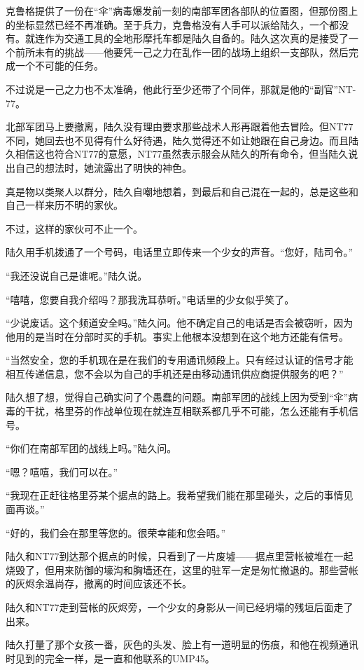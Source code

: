 克鲁格提供了一份在“伞”病毒爆发前一刻的南部军团各部队的位置图，但那份图上的坐标显然已经不再准确。至于兵力，克鲁格没有人手可以派给陆久，一个都没有。就连作为交通工具的全地形摩托车都是陆久自备的。陆久这次真的是接受了一个前所未有的挑战——他要凭一己之力在乱作一团的战场上组织一支部队，然后完成一个不可能的任务。

不过说是一己之力也不太准确，他此行至少还带了个同伴，那就是他的“副官”NT-77。

北部军团马上要撤离，陆久没有理由要求那些战术人形再跟着他去冒险。但NT77不同，她回去也不见得有什么好待遇，陆久觉得还不如让她跟在自己身边。而且陆久相信这也符合NT77的意愿，NT77虽然表示服会从陆久的所有命令，但当陆久说出自己的想法时，她流露出了明快的神色。

真是物以类聚人以群分，陆久自嘲地想着，到最后和自己混在一起的，总是这些和自己一样来历不明的家伙。

不过，这样的家伙可不止一个。

陆久用手机拨通了一个号码，电话里立即传来一个少女的声音。“您好，陆司令。”

“我还没说自己是谁呢。”陆久说。

“嘻嘻，您要自我介绍吗？那我洗耳恭听。”电话里的少女似乎笑了。

“少说废话。这个频道安全吗。”陆久问。他不确定自己的电话是否会被窃听，因为他用的是当时在分部时买的手机。事实上他根本没想到在这个地方还能有信号。

“当然安全，您的手机现在是在我们的专用通讯频段上。只有经过认证的信号才能相互传递信息，您不会以为自己的手机还是由移动通讯供应商提供服务的吧？”

陆久想了想，觉得自己确实问了个愚蠢的问题。南部军团的战线上因为受到“伞”病毒的干扰，格里芬的作战单位现在就连互相联系都几乎不可能，怎么还能有手机信号。

“你们在南部军团的战线上吗。”陆久问。

“嗯？嘻嘻，我们可以在。”

“我现在正赶往格里芬某个据点的路上。我希望我们能在那里碰头，之后的事情见面再谈。”

“好的，我们会在那里等您的。很荣幸能和您会晤。”

陆久和NT77到达那个据点的时候，只看到了一片废墟——据点里营帐被堆在一起烧毁了，但用来防御的壕沟和胸墙还在，这里的驻军一定是匆忙撤退的。那些营帐的灰烬余温尚存，撤离的时间应该还不长。

陆久和NT77走到营帐的灰烬旁，一个少女的身影从一间已经坍塌的残垣后面走了出来。

陆久打量了那个女孩一番，灰色的头发、脸上有一道明显的伤痕，和他在视频通讯时见到的完全一样，是一直和他联系的UMP45。

